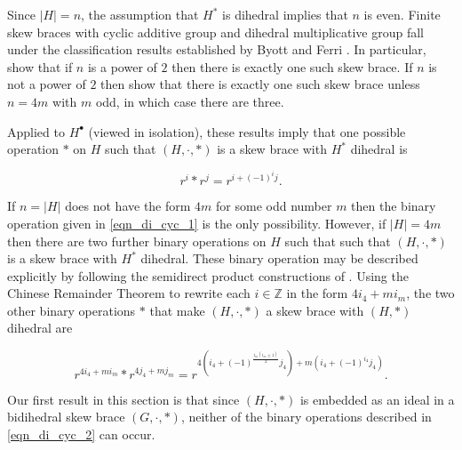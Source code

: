 \documentclass[reqno]{amsart}
\theoremstyle{definition}
\newcommand{\Z}{\mathbb{Z}}
\begin{document}
Since $ |H|=n $, the assumption that $ H^{\ast} $ is dihedral implies that $ n $ is even. Finite skew braces with cyclic additive group and dihedral multiplicative group fall under the classification results established by Byott and Ferri \cite{BF25}. In particular, \cite[Proposition 5.2 and Table 1]{BF25} show that if $ n $ is a power of $ 2 $ then there is exactly one such skew brace. If $ n $ is not a power of $ 2 $ then \cite[Theorem 12.8 and Proposition 12.10]{BF25} show that there is exactly one such skew brace unless $ n = 4m $ with $ m $ odd, in which case there are three.  

Applied  to $ H^{\bullet} $ (viewed in isolation), these results imply that one possible operation $ \ast $ on $ H $ such that $ (H,\cdot,\ast) $ is a skew brace with $ H^{\ast} $ dihedral is

\begin{equation} \label{eqn_di_cyc_1}
r^{i} \ast r^{j} = r^{i+(-1)^{i}j}. 
\end{equation}

If $ n=|H| $ does not have the form $ 4m $ for some odd number $ m $ then the binary operation given in \eqref{eqn_di_cyc_1} is the only possibility. However, if $ |H|=4m $ then there are two further binary operations on $ H $ such that such that $ (H,\cdot,\ast) $ is a skew brace with $ H^{\ast} $ dihedral. These binary operation may be described explicitly by following the semidirect product constructions of \cite[Theorem 12.8]{BF25}. Using the Chinese Remainder Theorem to rewrite each $ i \in \Z $ in the form $ 4i_{4} + mi_{m} $, the two other binary operations $ \ast $ that make $ (H,\cdot,\ast)$ a skew brace with $ (H,\ast) $ dihedral are 

\begin{equation} \label{eqn_di_cyc_2}
r^{4i_{4}+mi_{m}} \ast r^{4j_{4}+mj_{m}} = r^{4(i_{4}+(-1)^{\frac{i_{m}(i_{m} \pm 1)}{2}}j_{4}) + m(i_{4} + (-1)^{i_{4}}j_{4})}. 
\end{equation}

Our first result in this section is that since $ (H,\cdot,\ast) $ is embedded as an ideal in a bidihedral skew brace $ (G,\cdot,\ast) $, neither of the binary operations described in \eqref{eqn_di_cyc_2} can occur. 
\end{document}
